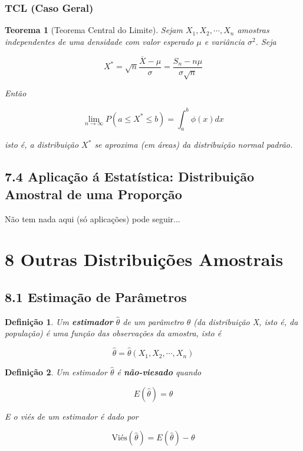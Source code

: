 \documentclass[12pt]{article}
\newtheorem{theorem}{Teorema}[section]
\newtheorem{definition}{Definição}
\begin{document}
\subsubsection*{TCL (Caso Geral)}
\begin{theorem}[Teorema Central do Limite]
Sejam $X_1, X_2, \cdots, X_n$ amostras independentes de uma densidade com valor esperado $\mu$ e variância $\sigma^2$. Seja

$$X^* = \sqrt{n} \frac{\overline{X} - \mu}{\sigma} = \frac{S_n - n \mu}{\sigma \sqrt{n}}$$

Então

$$\lim_{n \rightarrow \infty} P(a \leq X^* \leq b) = \int_a^b \phi(x) d x$$

isto é, a distribuição $X^*$ se aproxima (em áreas) da distribuição normal padrão.
\end{theorem}

\subsection*{7.4 Aplicação á Estatística: Distribuição Amostral de uma Proporção}
\label{s34}

Não tem nada aqui (só aplicações) pode seguir...

\section*{8 Outras Distribuições Amostrais}
\label{s35}

\subsection*{8.1 Estimação de Parâmetros}
\label{s36}

\begin{definition}
    Um \textbf{estimador} $\hat{\theta}$ de um parâmetro $\theta$ (da distribuição X, isto é, da população) é uma função das observações da amostra, isto é
    
    $$\hat{\theta} = \hat{\theta}(X_1, X_2, \cdots, X_n)$$
\end{definition}

\begin{definition}
    Um estimador $\hat{\theta}$ é \textbf{não-viesado} quando
    
    $$E(\hat{\theta}) = \theta$$
    
    E o viés de um estimador é dado por
    
    $$\text{Viés} (\hat{\theta}) = E(\hat{\theta}) - \theta$$
\end{definition}
\end{document}

